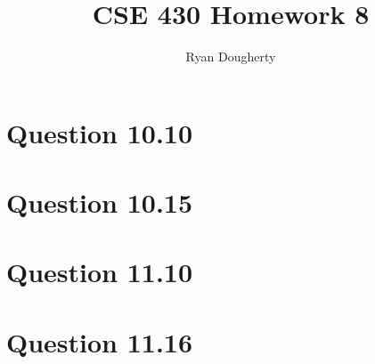 \documentclass[12pt]{article}
\title{CSE 430 Homework 8}
\author{Ryan Dougherty}
\date{}                                           %
\begin{document}
\maketitle

\section*{Question 10.10}

\section*{Question 10.15}

\section*{Question 11.10}

\section*{Question 11.16}
\end{document}
